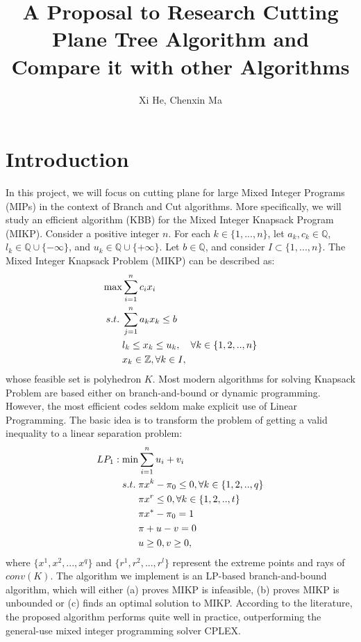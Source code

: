 \documentclass[a4paper,10pt]{article}
\title{A Proposal to Research Cutting Plane Tree Algorithm and Compare it with other Algorithms}
\author{Xi He, Chenxin Ma}
\begin{document}
\maketitle
 
\section{Introduction} 

In this project, we will focus on cutting plane for large Mixed Integer Programs (MIPs) in the context of Branch and Cut algorithms. More specifically, we will study an efficient algorithm (KBB) for the Mixed Integer Knapsack Program (MIKP). 
Consider a positive integer $n$. For each $k\in\{1,...,n\}$, let $a_k, c_k\in \mathbb Q$, $l_k\in \mathbb Q\cup \{-\infty\}$, and $u_k\in \mathbb Q\cup \{+\infty\}$. Let $b\in\mathbb Q$, and consider $I\subset \{1,...,n\}$. The Mixed Integer Knapsack Problem (MIKP) can be described as:
\begin{align}
\max &\sum_{i=1}^{n}c_ix_i \notag\\
s.t. \; &\sum_{j=1}^{n} a_{k}x_k\leq b \notag\\
&l_k\leq x_k\leq u_k,\quad\forall k\in\{1,2,..,n\} \notag\\
&x_k\in \mathbb Z, \forall k\in I,
\end{align} 
whose feasible set is polyhedron $K$. Most modern algorithms for solving Knapsack Problem are based either on branch-and-bound or dynamic programming. However, the most efficient codes seldom make explicit use of Linear Programming.  The basic idea is to transform the problem of getting a valid inequality to a linear separation problem:
\begin{align}
LP_1: \min &\sum_{i=1}^{n} u_i+v_i \notag\\
s.t. \;  & \pi x^k-\pi_0\leq 0,  \forall k\in\{1,2,..,q\} \notag\\
& \pi x^r\leq 0, \forall  k\in\{1,2,..,t\} \notag\\
& \pi x^*-\pi_0 = 1 \notag\\
& \pi+u-v = 0 \notag\\
&u\geq 0, v\geq 0\notag,
\end{align}
where $\{x^1, x^2,...,x^q\}$ and $\{r^1,r^2,..., r^l\}$ represent the extreme points and rays of $conv(K)$. The algorithm we implement is an LP-based branch-and-bound algorithm,  which will either (a) proves MIKP is infeasible, (b) proves MIKP is unbounded or (c) finds an optimal solution to MIKP. According to the literature, the proposed algorithm performs quite well in practice, outperforming the general-use mixed integer programming solver CPLEX. 
\end{document}
